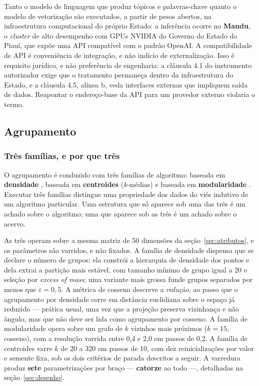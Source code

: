 Tanto o modelo de linguagem que produz tópicos e palavras-chave quanto o modelo de vetorização são executados, a partir de pesos abertos, na infraestrutura computacional do próprio Estado: a inferência ocorre no \textbf{Mandu}, o \emph{cluster} de alto desempenho com GPUs NVIDIA do Governo do Estado do Piauí, que expõe uma API compatível com o padrão OpenAI. A compatibilidade de API é conveniência de integração, e não indício de externalização. Isso é requisito jurídico, e não preferência de engenharia: a cláusula 4.1 do instrumento autorizador exige que o tratamento permaneça dentro da infraestrutura do Estado, e a cláusula 4.5, alínea b, veda interfaces externas que impliquem saída de dados. Reapontar o endereço-base da API para um provedor externo violaria o termo.

\subsection{Agrupamento}\label{sec:agrupamento}

\subsubsection{Três famílias, e por que três}\label{sec:familias}

O agrupamento é conduzido com três famílias de algoritmo: baseada em \textbf{densidade}
\cite{campello2013hdbscan, mcinnes2017hdbscan}, baseada em \textbf{centroides}
(\textit{k}-médias) e baseada em \textbf{modularidade} \cite{traag2019leiden}. Executar três
famílias distingue uma propriedade dos dados do viés indutivo de um algoritmo particular. Uma estrutura que só aparece sob uma das três é um achado sobre o
algoritmo; uma que aparece sob as três é um achado sobre o acervo.

As três operam sobre a mesma matriz de 50 dimensões da seção~\ref{sec:atributos}, e os parâmetros
são varridos, e não fixados. A família de densidade dispensa que se declare o número de grupos:
ela constrói a hierarquia de densidade dos pontos e dela extrai a partição mais estável, com
tamanho mínimo de grupo igual a 20 e seleção por \emph{excess of mass}; uma variante mais grossa
funde grupos separados por menos que $\varepsilon = 0{,}5$. A métrica de cosseno descreve a \emph{redução}, ao passo que o agrupamento por
densidade corre em distância euclidiana sobre o espaço já reduzido --- prática usual, uma vez que a
projeção preserva vizinhança e não ângulo, mas que não deve ser lida como agrupamento por cosseno.
A família de modularidade opera sobre um grafo de $k$ vizinhos mais próximos ($k = 15$, cosseno),
com a resolução varrida entre 0,4 e 2,0 em passos de 0,2. A família de centroides varre $k$ de 20 a
320 em passos de 10, com dez reinicializações por valor e semente fixa, sob os dois critérios de
parada descritos a seguir. A varredura produz \textbf{sete} parametrizações por braço ---
\textbf{catorze} ao todo ---, detalhadas na seção~\ref{sec:desenho}.

